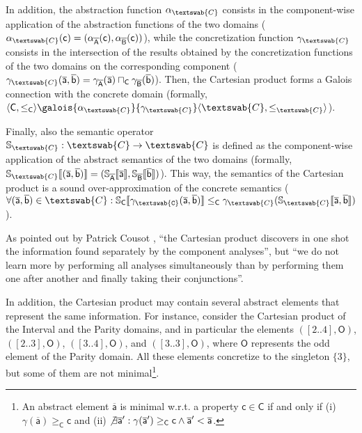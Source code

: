 \documentclass[submission,copyright,creativecommons]{eptcs}
\newcommand{\funzione}[2]{\ensuremath{#1 \rightarrow#2}}
\newcommand{\sem}[1]{\ensuremath{\llbracket \mathtt{#1} \rrbracket}}
\newcommand{\semanticanome}[1]{\ensuremath{\mathbb{#1}}}
\newcommand{\cset}[1]{\ensuremath{\mathsf{#1}}}
\newcommand{\cel}[1]{\ensuremath{\mathsf{#1}}}
\newcommand{\ael}[1]{\cel{\overline{#1}}}
\newcommand{\firstdomain}{\aset{A}}
\newcommand{\seconddomain}{\aset{B}}
\newcommand{\concretedomain}{\cset{C}}
\newcommand{\cartesiandomain}{\textswab{C}}
\newcommand{\firstsemantics}{\semanticanome{S}_\firstdomain}
\newcommand{\secondsemantics}{\semanticanome{S}_\seconddomain}
\newcommand{\concretesemantics}{\semanticanome{S}_\concretedomain}
\newcommand{\cartesiansemantics}{\semanticanome{S}_\cartesiandomain}
\newcommand{\firstsemanticsapplication}[1]{\firstsemantics\sem{#1}}
\newcommand{\secondsemanticsapplication}[1]{\secondsemantics\sem{#1}}
\newcommand{\concretesemanticsapplication}[1]{\concretesemantics\sem{#1}}
\newcommand{\cartesiansemanticsapplication}[1]{\cartesiansemantics\sem{#1}}
\begin{document}
In addition, the abstraction function $\alpha_\cartesiandomain$ consists in the component-wise application of the abstraction functions of the two domains ($\alpha_\cartesiandomain(\cel{c}) = (\alpha_\firstdomain(\cel{c}), \alpha_\seconddomain(\cel{c}))$), while the concretization function $\gamma_\cartesiandomain$ consists in the intersection of the results obtained by the concretization functions of the two domains on the corresponding component ($\gamma_\cartesiandomain(\ael{a}, \ael{b}) = \gamma_\firstdomain(\ael{a}) \sqcap_\concretedomain \gamma_\seconddomain(\ael{b})$). Then, the Cartesian product forms a Galois connection with the concrete domain (formally, $\langle \concretedomain, \leq_\concretedomain \rangle \galois{\alpha_\cartesiandomain}{\gamma_\cartesiandomain} \langle \cartesiandomain, \leq_\cartesiandomain \rangle$).

Finally, also the semantic operator $\cartesiansemantics : \funzione{\cartesiandomain}{\cartesiandomain}$ is defined as the component-wise application of the abstract semantics of the two domains (formally, $\cartesiansemanticsapplication{(\ael{a}, \ael{b})} = (\firstsemanticsapplication{\ael{a}}, \secondsemanticsapplication{\ael{b}})$). This way, the semantics of the Cartesian product is a sound over-approximation of the concrete semantics ($\forall (\ael{a}, \ael{b}) \in \cartesiandomain : \concretesemanticsapplication{\gamma_\cartesiandomain(\ael{a}, \ael{b})} \leq_\concretedomain \gamma_\cartesiandomain(\cartesiansemanticsapplication{\ael{a}, \ael{b}})$).


As pointed out by Patrick Cousot \cite{MIT}, \textquotedblleft the Cartesian product discovers in one shot the information found separately by the component analyses\textquotedblright, but \textquotedblleft we do not learn more by performing all analyses simultaneously than by performing them one after another and finally taking their conjunctions\textquotedblright.

In addition, the Cartesian product may contain several abstract elements that represent the same information. For instance, consider the Cartesian product of the Interval and the Parity domains, and in particular the elements $([2..4], \cel{O})$, $([2..3], \cel{O})$, $([3..4], \cel{O})$, and $([3..3], \cel{O})$, where $\cel{O}$ represents the odd element of the Parity domain. All these elements concretize to the singleton $\{3\}$, but some of them are not minimal\footnote{An abstract element $\ael{a}$ is minimal w.r.t. a property $\cel{c} \in \concretedomain$ if and only if (i) $\gamma(\ael{a}) \geq_\concretedomain \cel{c}$ and (ii) $\not \exists \ael{a}' : \gamma(\ael{a}') \geq_\concretedomain \cel{c} \wedge \ael{a}' < \ael{a}$.}.
\end{document}
